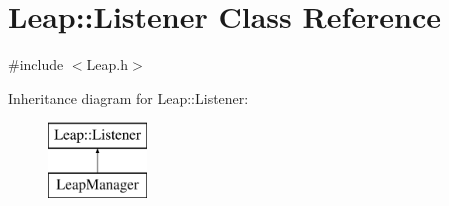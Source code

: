 \hypertarget{class_leap_1_1_listener}{\section{Leap\+:\+:Listener Class Reference}
\label{class_leap_1_1_listener}
}


{\ttfamily \#include $<$Leap.\+h$>$}

Inheritance diagram for Leap\+:\+:Listener\+:\begin{figure}[H]
\begin{center}
\leavevmode
\includegraphics[height=2.000000cm]{class_leap_1_1_listener}
\end{center}
\end{figure}
